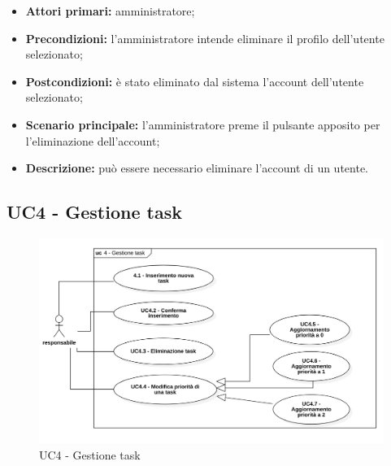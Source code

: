\begin{itemize}
	\item 	\textbf{Attori primari:} amministratore;
	\item 	\textbf{Precondizioni:} l'amministratore intende eliminare il profilo dell'utente selezionato;
	\item 	\textbf{Postcondizioni:} è stato eliminato dal sistema l'account dell'utente selezionato;
	\item 	\textbf{Scenario principale:} l'amministratore preme il pulsante apposito per l'eliminazione dell'account;
	\item 	\textbf{Descrizione:} può essere necessario eliminare l'account di un utente.
\end{itemize}

\subsection{UC4 - Gestione task}

\begin{figure}[H]
	\centering
	\includegraphics[scale=0.52]{res/images/uc4.png}
	\caption{UC4 - Gestione task}
\end{figure}

